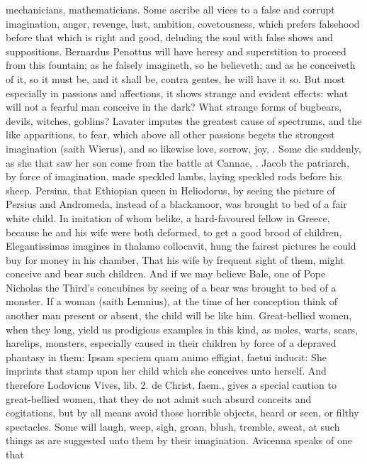 {mechanicians, mathematicians. Some ascribe all vices to a false and
corrupt imagination, anger, revenge, lust, ambition, covetousness,
which prefers falsehood before that which is right and good, deluding
the soul with false shows and suppositions. Bernardus Penottus
will have heresy and superstition to proceed from this fountain; as he
falsely imagineth, so he believeth; and as he conceiveth of it, so it
must be, and it shall be, contra gentes, he will have it so. But most
especially in passions and affections, it shows strange and evident
effects: what will not a fearful man conceive in the dark? What strange
forms of bugbears, devils, witches, goblins? Lavater imputes the
greatest cause of spectrums, and the like apparitions, to fear, which
above all other passions begets the strongest imagination (saith
Wierus), and so likewise love, sorrow, joy, \etc{}. Some die
suddenly, as she that saw her son come from the battle at Cannae, \etc{}.
Jacob the patriarch, by force of imagination, made speckled lambs,
laying speckled rods before his sheep. Persina, that Ethiopian queen in
Heliodorus, by seeing the picture of Persius and Andromeda, instead of
a blackamoor, was brought to bed of a fair white child. In imitation of
whom belike, a hard-favoured fellow in Greece, because he and his wife
were both deformed, to get a good brood of children, Elegantissimas
imagines in thalamo collocavit, \etc{} hung the fairest pictures he could
buy for money in his chamber, That his wife by frequent sight of them,
might conceive and bear such children. And if we may believe Bale, one
of Pope Nicholas the Third's concubines by seeing of a bear was
brought to bed of a monster. If a woman (saith  Lemnius), at the
time of her conception think of another man present or absent, the
child will be like him. Great-bellied women, when they long, yield us
prodigious examples in this kind, as moles, warts, scars, harelips,
monsters, especially caused in their children by force of a depraved
phantasy in them: Ipsam speciem quam animo effigiat, faetui inducit:
She imprints that stamp upon her child which she conceives unto
herself. And therefore Lodovicus Vives, lib. 2. de Christ, faem., gives
a special caution to great-bellied women, that they do not admit
such absurd conceits and cogitations, but by all means avoid those
horrible objects, heard or seen, or filthy spectacles. Some will laugh,
weep, sigh, groan, blush, tremble, sweat, at such things as are
suggested unto them by their imagination. Avicenna speaks of one that
}
